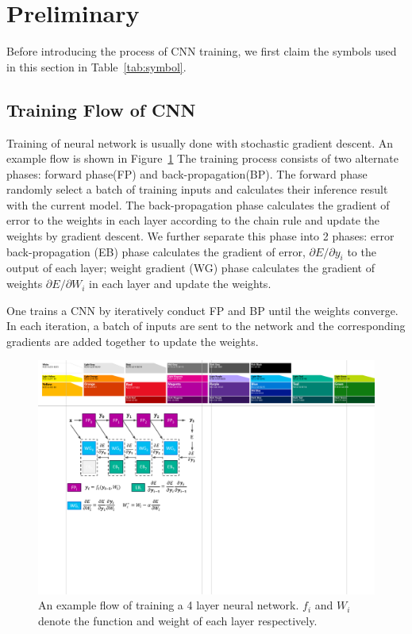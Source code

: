 \section{Preliminary}\label{sec:preliminary}
Before introducing the process of CNN training, we first claim the symbols used in this section in Table~\ref{tab:symbol}.



\subsection{Training Flow of CNN}
Training of neural network is usually done with stochastic gradient descent. An example flow is shown in Figure~\ref{fig:train_prelim} The training process consists of two alternate phases: forward phase(FP) and back-propagation(BP). The forward phase randomly select a batch of training inputs and calculates their inference result with the current model. The back-propagation phase calculates the gradient of error to the weights in each layer according to the chain rule and update the weights by gradient descent. We further separate this phase into 2 phases: error back-propagation (EB) phase calculates the gradient of error, $\partial E/\partial y_i$ to the output of each layer; weight gradient (WG) phase calculates the gradient of weights $\partial E/\partial W_i$ in each layer and update the weights. 

One trains a CNN by iteratively conduct FP and BP until the weights converge. In each iteration, a batch of inputs are sent to the network and the corresponding gradients are added together to update the weights.

\begin{figure}[t]
  \centering
  \includegraphics[width=0.9\columnwidth]{figures/train_prelim.pdf}
  \caption{An example flow of training a 4 layer neural network. $f_i$ and $W_i$ denote the function and weight of each layer respectively.}
  \label{fig:train_prelim}
\end{figure}

